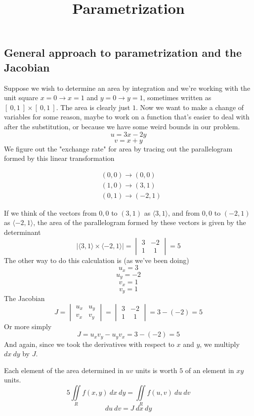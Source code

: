 \documentclass[11pt, oneside]{article}
\title{Parametrization}
\date{}
\begin{document}
\maketitle
\Large


\subsection*{General approach to parametrization and the Jacobian}
Suppose we wish to determine an area by integration and we're working with the unit square $x=0 \to x=1$ and $y=0 \to y=1$, sometimes written as $[\ 0,1\ ] \times [\ 0,1\ ]$.  The area is clearly just $1$.  Now we want to make a change of variables for some reason, maybe to work on a function that's easier to deal with after the substitution, or because we have some weird bounds in our problem.
\[ u = 3x-2y \]
\[ v = x + y \]
We figure out the "exchange rate" for area by tracing out the parallelogram formed by this linear transformation

\begin{align*}
& (0,0) \to (0,0) \\
& (1,0) \to (3,1) \\
& (0,1) \to (-2,1)
\end{align*}

If we think of the vectors from $0,0$ to $(3,1)$ as $\langle 3, 1 \rangle$,  and from $0,0$ to $(-2,1)$ as $\langle -2 ,1 \rangle$, the area of the parallelogram formed by these vectors is given by the determinant
\[
| \langle 3, 1 \rangle \times \langle -2 ,1 \rangle | =
\begin{vmatrix}
3 & -2 \\
1 & \ \ 1 
\end{vmatrix} = 5
\]
The other way to do this calculation is (as we've been doing)
\[ u_x = 3 \]
\[ u_y = -2 \]
\[ v_x = 1 \]
\[ v_y = 1 \]
The Jacobian
\[ J = 
\begin{vmatrix}
u_x & u_y \\
v_x & v_y 
\end{vmatrix} = 
\begin{vmatrix}
3 & -2 \\
1 & \ \ 1 
\end{vmatrix}
= 3 - (-2) = 5 \]
Or more simply
\[ J = u_x v_y - u_y v_x = 3  - (-2) = 5 \]
And again, since we took the derivatives with respect to $x$ and $y$, we multiply $dx \ dy$ by $J$.

Each element of the area determined in $uv$ units is worth $5$ of an element in $xy$ units.
\[ 5 \iint\limits_{R}  f(x,y) \ dx \ dy = \iint\limits_{R}  f(u,v) \ du \ dv \]
\begin{equation}
\boxed{du \ dv = J \ dx \ dy }
\end{equation}
\end{document}
